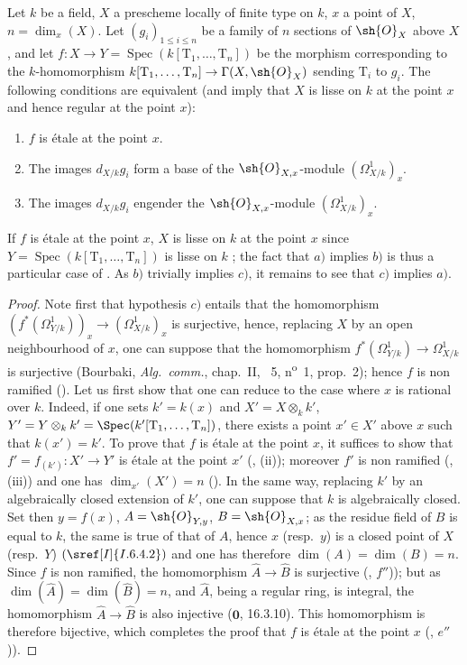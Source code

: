 \begin{proposition}[17.15.3]
\label{IV.17.15.3}
Let $k$ be a field, $X$ a prescheme locally of finite type on $k$, $x$ a point of $X$, $n=\dim_x(X)$.
Let $(g_i)_{1\leq i\leq n}$ be a family of $n$ sections of $\sh{O}_X$ above $X$, and let $f:X\to Y=\operatorname{Spec}(k[\mathrm{T}_1,\ldots,\mathrm{T}_n])$ be the morphism corresponding to the $k$-homomorphism $k[\mathrm{T}_1,\ldots,\mathrm{T}_n]\to\Gamma(X,\sh{O}_X)$ sending $\mathrm{T}_i$ to $g_i$.
The following conditions are equivalent (and imply that $X$ is lisse on $k$ at the point $x$ and hence regular at the point $x$):
\begin{enumerate}
  \item[a)] $f$ is \'etale at the point $x$.
  \item[b)] The images $d_{X/k} g_i$ form a base of the $\sh{O}_{X,x}$-module $(\Omega^1_{X/k})_x$.
  \item[c)] The images $d_{X/k} g_i$ engender the $\sh{O}_{X,x}$-module $(\Omega^1_{X/k})_x$.
\end{enumerate}
If $f$ is \'etale at the point $x$, $X$ is lisse on $k$ at the point $x$ since $Y=\operatorname{Spec}(k[\mathrm{T}_1,\ldots,\mathrm{T}_n])$ is lisse on $k$ ; the fact that $a)$ implies $b)$ is thus a particular case of .
As $b)$ trivially implies $c)$, it remains to see that $c)$ implies $a)$.
\end{proposition}

\begin{proof}
Note first that hypothesis $c)$ entails that the homomorphism $(f^*(\Omega^1_{Y/k}))_x\to(\Omega^1_{X/k})_x$ is surjective, hence, replacing $X$ by an open neighbourhood of $x$, one can suppose that the homomorphism $f^*(\Omega^1_{Y/k})\to\Omega^1_{X/k}$ is surjective (Bourbaki, \emph{Alg.~comm.}, chap.~II, \textsection~5, n\textsuperscript{o}~1, prop.~2); hence $f$ is non ramified ().
Let us first show that one can reduce to the case where $x$ is rational over $k$.
Indeed, if one sets $k'=k(x)$ and $X'=X\otimes_k k'$, $Y'=Y\otimes_k k'=\Spec(k'[\mathrm{T}_1,\ldots,\mathrm{T}_n])$, there exists a point $x'\in X'$ above $x$ such that $k(x')=k'$.
To prove that $f$ is \'etale at the point $x$, it suffices to show that $f'=f_{(k')}:X'\to Y'$ is \'etale at the point $x'$ (, (ii)); moreover $f'$ is non ramified (, (iii)) and one has $\dim_{x'}(X')=n$ ().
In the same way, replacing $k'$ by an algebraically closed extension of $k'$, one can suppose that $k$ is algebraically closed.
Set then $y=f(x)$, $A=\sh{O}_{Y,y}$, $B=\sh{O}_{X,x}$; as the residue field of $B$ is equal to $k$, the same is true of that of $A$, hence $x$ (resp.\ $y$) is a closed point of $X$ (resp.\ $Y$) $(\sref[I]{I.6.4.2})$ and one has therefore $\dim(A)=\dim(B)=n$.
Since $f$ is non ramified, the homomorphism $\hat{A}\to\hat{B}$ is surjective (, $f''$)); but as $\dim(\hat{A})=\dim(\hat{B})=n$, and $\hat{A}$, being a regular ring, is integral, the homomorphism $\hat{A}\to\hat{B}$ is also injective ($\mathbf{0}$, 16.3.10).
This homomorphism is therefore bijective, which completes the proof that $f$ is \'etale at the point $x$ (, $e''$)).
\end{proof}

